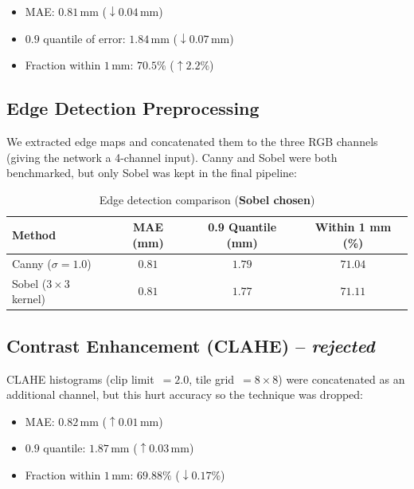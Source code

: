 \documentclass{article}
\begin{document}
\begin{itemize}
    \item MAE: $0.81\,\text{mm}$ ($\downarrow 0.04\,\text{mm}$)
    \item $0.9$ quantile of error: $1.84\,\text{mm}$ ($\downarrow 0.07\,\text{mm}$)
    \item Fraction within $1\,\text{mm}$: $70.5\%$ ($\uparrow 2.2\%$)
\end{itemize}

\subsection{Edge Detection Preprocessing}
We extracted edge maps and concatenated them to the three RGB channels (giving the network a 4-channel input). Canny and Sobel were both benchmarked, but only Sobel was kept in the final pipeline:

\begin{table}[H]
    \centering
    \begin{tabular}{|l|c|c|c|}
        \hline
        Method                    & MAE (mm) & 0.9 Quantile (mm) & Within 1 mm (\%) \\
        \hline
        Canny ($\sigma=1.0$)      & $0.81$    & $1.79$            & $71.04$          \\
        Sobel ($3\times3$ kernel) & $0.81$   & $1.77$            & $71.11$          \\
        \hline
    \end{tabular}
    \caption{Edge detection comparison (\textbf{Sobel chosen})}
    \label{tab:edge_results}
\end{table}

\subsection{Contrast Enhancement (CLAHE) -- \emph{rejected}}
CLAHE histograms (clip limit~$=2.0$, tile grid~$=8\times8$) were concatenated as an additional channel, but this hurt accuracy so the technique was dropped:

\begin{itemize}
    \item MAE: $0.82\,\text{mm}$ ($\uparrow 0.01\,\text{mm}$)
    \item $0.9$ quantile: $1.87\,\text{mm}$ ($\uparrow 0.03\,\text{mm}$)
    \item Fraction within $1\,\text{mm}$: $69.88\%$ ($\downarrow 0.17\%$)
\end{itemize}
\end{document}
